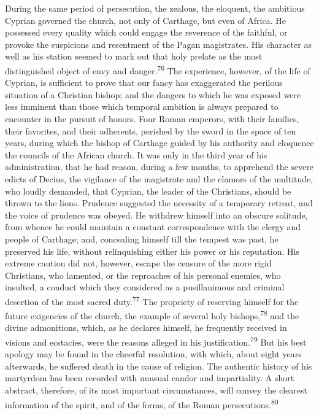 During the same period of persecution, the zealous, the eloquent,
the ambitious Cyprian governed the church, not only of Carthage,
but even of Africa. He possessed every quality which could engage
the reverence of the faithful, or provoke the suspicions and
resentment of the Pagan magistrates. His character as well as his
station seemed to mark out that holy prelate as the most
distinguished object of envy and danger.\textsuperscript{76} The experience,
however, of the life of Cyprian, is sufficient to prove that our
fancy has exaggerated the perilous situation of a Christian
bishop; and the dangers to which he was exposed were less
imminent than those which temporal ambition is always prepared to
encounter in the pursuit of honors. Four Roman emperors, with
their families, their favorites, and their adherents, perished by
the sword in the space of ten years, during which the bishop of
Carthage guided by his authority and eloquence the councils of
the African church. It was only in the third year of his
administration, that he had reason, during a few months, to
apprehend the severe edicts of Decius, the vigilance of the
magistrate and the clamors of the multitude, who loudly demanded,
that Cyprian, the leader of the Christians, should be thrown to
the lions. Prudence suggested the necessity of a temporary
retreat, and the voice of prudence was obeyed. He withdrew
himself into an obscure solitude, from whence he could maintain a
constant correspondence with the clergy and people of Carthage;
and, concealing himself till the tempest was past, he preserved
his life, without relinquishing either his power or his
reputation. His extreme caution did not, however, escape the
censure of the more rigid Christians, who lamented, or the
reproaches of his personal enemies, who insulted, a conduct which
they considered as a pusillanimous and criminal desertion of the
most sacred duty.\textsuperscript{77} The propriety of reserving himself for the
future exigencies of the church, the example of several holy
bishops,\textsuperscript{78} and the divine admonitions, which, as he declares
himself, he frequently received in visions and ecstacies, were
the reasons alleged in his justification.\textsuperscript{79} But his best apology
may be found in the cheerful resolution, with which, about eight
years afterwards, he suffered death in the cause of religion. The
authentic history of his martyrdom has been recorded with unusual
candor and impartiality. A short abstract, therefore, of its most
important circumstances, will convey the clearest information of
the spirit, and of the forms, of the Roman persecutions.\textsuperscript{80}

